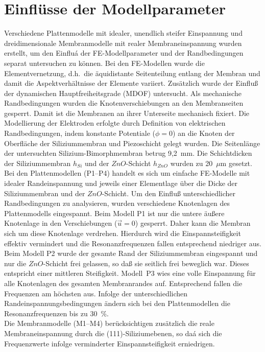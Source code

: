 \section{Einflüsse der Modellparameter}
\label{piezomodell}

Verschiedene Plattenmodelle mit idealer, unendlich steifer Einspannung
und dreidimensionale Membranmodelle mit realer Membraneinspannung
wurden erstellt, um den Einfluá der FE-Modellparameter und der
Randbedingungen separat untersuchen zu können.
Bei den FE-Modellen wurde die Elementvernetzung, d.h.\ die äquidistante
Seitenteilung entlang der Membran und damit die Aspektverhältnisse der
Elemente variiert. Zusätzlich wurde der Einfluß der dynamischen
Hauptfreiheitsgrade (MDOF) untersucht. Als mechanische Randbedingungen
wurden die Knotenverschiebungen an den Membranseiten gesperrt. Damit ist
die Membranen an ihrer Unterseite mechanisch fixiert. Die Modellierung
der Elektroden erfolgte durch Definition von elektrischen Randbedingungen,
indem konstante Potentiale ($\phi = 0$) an die Knoten der Oberfläche der
Siliziummembran und Piezoschicht gelegt wurden. Die Seitenlänge der
untersuchten Silizium-Bimorphmembran betrug 9,2~mm. Die Schichtdicken
der Siliziummembran $h_{Si}$ und der $ZnO$-Schicht $h_{ZnO}$ wurden
zu 20~$\mu$m gesetzt.\\
%
Bei den Plattenmodellen (P1--P4) handelt es sich um einfache FE-Modelle
mit idealer Randeinspannung und jeweils einer Elementlage über die Dicke
der Siliziummembran und der $ZnO$-Schicht.
Um den Einfluß unterschiedlicher Randbedingungen zu analysieren, wurden
verschiedene Knotenlagen des Plattenmodells eingespannt. Beim Modell P1 ist
nur die untere äußere Knotenlage in den Verschiebungen ($\vec u=0$) gesperrt.
Daher kann die Membran sich um diese Knotenlage verdrehen. Hierdurch wird
die Einspannsteifigkeit effektiv vermindert und die Resonanzfrequenzen
fallen entsprechend niedriger aus. Beim Modell P2 wurde der gesamte Rand der
Siliziummembran eingespannt und nur die $ZnO$-Schicht frei gelassen, so daß
sie seitlich frei beweglich war. Dieses entspricht einer mittleren
Steifigkeit. Modell~P3 wies eine volle Einspannung für alle Knotenlagen des
gesamten Membranrandes auf. Entsprechend fallen die Frequenzen am höchsten
aus. Infolge der unterschiedlichen Randeinspannungsbedingungen ändern sich
bei den Plattenmodellen die Resonanzfrequenzen bis zu 30~\%. \\
%
Die Membranmodelle (M1--M4) berücksichtigen zusätzlich die reale
Membraneinspannung durch die (111)-Siliziumebenen, so daá sich die
Frequenzwerte infolge verminderter Einspannsteifigkeit erniedrigen.

